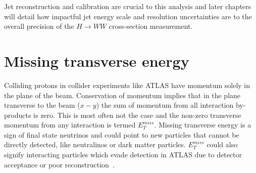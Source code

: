 Jet reconstruction and calibration are crucial to this analysis and later chapters will detail how impactful jet energy scale and resolution uncertainties are to the overall precision of the $H\rightarrow WW$ cross-section measurement. 

\section{Missing transverse energy}
Colliding protons in collider experiments like ATLAS have momentum solely in the plane of the beam. Conservation of momentum implies that in the plane transverse to the beam ($x-y$) the sum of momentum from all interaction by-products is zero. This is most often not the case and the non-zero transverse momentum from any interaction is termed $E_T^{miss}$. Missing transverse energy is a sign of final state neutrinos and could point to new particles that cannot be directly detected, like neutralinos or dark matter particles. $E_T^{miss}$ could also signify interacting particles which evade detection in ATLAS due to detector acceptance or poor reconstruction~\cite{METSig}. 

